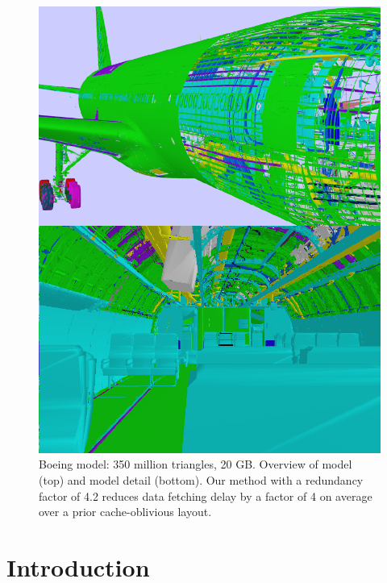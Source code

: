 
\begin{figure}[h!]
  \centering
  \includegraphics[width=\columnwidth]{BoeingModel.pdf}
  \caption{Boeing model: 350 million triangles, 20 GB. Overview of model (top)
and model detail (bottom). Our method with a redundancy factor of 4.2 reduces
data fetching delay by a factor of 4 on average over a
prior cache-oblivious
layout.}
  \label{fig:model2}
\end{figure}

\section{Introduction}


